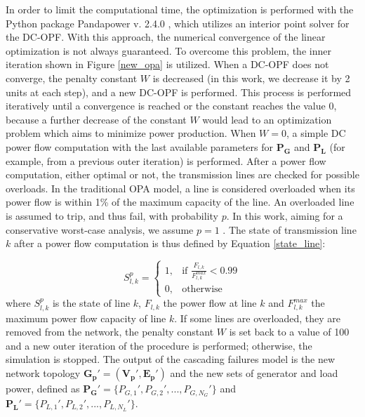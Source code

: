 \documentclass[review]{elsarticle}
\begin{document}
 In order to limit the computational time, the optimization is performed with the Python package Pandapower v. 2.4.0 \cite{pandapower.2018}, which utilizes an interior point solver for the DC-OPF. With this approach, the numerical convergence of the linear optimization is not always guaranteed. To overcome this problem, the inner iteration shown in Figure \ref{new_opa} is utilized. When a DC-OPF does not converge, the penalty constant $W$ is decreased (in this work, we decrease it by 2 units at each step), and a new DC-OPF is performed. This process is performed iteratively until a convergence is reached or the constant reaches the value 0, because a further decrease of the constant $W$ would lead to an optimization problem which aims to minimize power production. When $W=0$, a simple DC power flow computation with the last available parameters for $\mathbf{P_G}$ and $\mathbf{P_L}$ (for example, from a previous outer iteration) is performed. After a power flow computation, either optimal or not, the transmission lines are checked for possible overloads. In the traditional OPA model, a line is considered overloaded when its power flow is within 1\% of the maximum capacity of the line. An overloaded line is assumed to trip, and thus fail, with probability $p$. In this work, aiming for a conservative worst-case analysis, we assume $p=1$ \cite{cupac2013comparing}. The state of transmission line $k$ after a power flow computation is thus defined by Equation \eqref{state_line}:
 
 	\begin{equation}
	     S^p_{l,k} =
  \begin{cases}
    1, & \text{if $\frac{F_{l,k}}{F_{l,k}^{max}} < 0.99$}\\
    0, & \text{otherwise}
  \end{cases}
  \label{state_line}
	\end{equation}
where $S^p_{l,k}$ is the state of line $k$, $F_{l,k}$ the power flow at line $k$ and $F_{l,k}^{max}$ the maximum power flow capacity of line $k$. If some lines are overloaded, they are removed from the network, the penalty constant $W$ is set back to a value of 100 and a new outer iteration of the procedure is performed; otherwise, the simulation is stopped. The output of the cascading failures model is the new network topology $\mathbf{G_p'}=(\mathbf{V_p'},\mathbf{E_p'})$ and the new sets of generator and load power, defined as $\mathbf{P_G'} = \{ P_{G,1}', P_{G,2}',...,P_{G,N_G}'  \}$ and $\mathbf{P_L'} = \{ P_{L,1}', P_{L,2}',...,P_{L,N_L}'  \}$.
\end{document}

